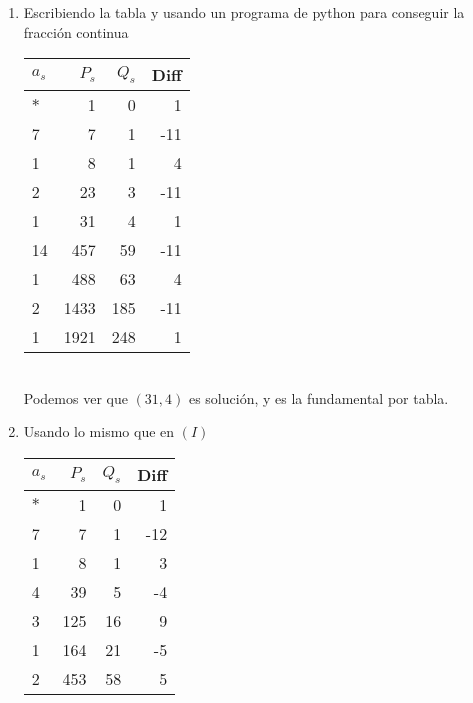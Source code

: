 \begin{sol}
	\begin{enumerate}[label = (\roman*)]
		\item Escribiendo la tabla y usando un programa de python\cite{prog} para conseguir la fracción continua\\
		      \begin{tabular}{| l | r | r | r |}
			      \hline
			      $a_s$ & $P_s$ & $Q_s$ & Diff \\
			      \hline\hline
			      $*$   & 1     & 0     & 1    \\
			      \hline
			      7     & 7     & 1     & -11  \\
			      \hline
			      1     & 8     & 1     & 4    \\
			      \hline
			      2     & 23    & 3     & -11  \\
			      \hline
			      1     & 31    & 4     & 1    \\
			      \hline
			      14    & 457   & 59    & -11  \\
			      \hline
			      1     & 488   & 63    & 4    \\
			      \hline
			      2     & 1433  & 185   & -11  \\
			      \hline
			      1     & 1921  & 248   & 1    \\
			      \hline
		      \end{tabular}\\
		      Podemos ver que $(31,4)$ es solución, y es la fundamental por tabla.
		\item Usando lo mismo que en $(I)$\\
		      \begin{tabular}{| l | r | r | r |}
			      \hline
			      $a_s$ & $P_s$      & $Q_s$     & Diff \\
			      \hline\hline
			      $*$   & 1          & 0         & 1    \\
			      \hline
			      7     & 7          & 1         & -12  \\
			      \hline
			      1     & 8          & 1         & 3    \\
			      \hline
			      4     & 39         & 5         & -4   \\
			      \hline
			      3     & 125        & 16        & 9    \\
			      \hline
			      1     & 164        & 21        & -5   \\
			      \hline
			      2     & 453        & 58        & 5    \\

\end{tabular}
\end{enumerate}
\end{sol}
